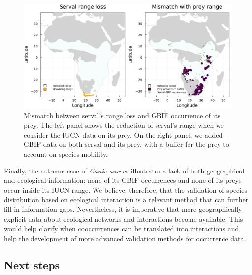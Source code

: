 \documentclass[11pt]{article}
\makeatletter
\def\maxwidth{\ifdim\Gin@nat@width>\linewidth\linewidth
\else\Gin@nat@width\fi}
\let\Oldincludegraphics\includegraphics
\renewcommand{\includegraphics}[1]{\Oldincludegraphics[width=\maxwidth]{#1}}
\makeatother
\begin{document}
\begin{figure}
\hypertarget{fig:serval}{%
\centering
\includegraphics{figures/serval_mismatch_combined.png}
\caption{Mismatch between serval's range loss and GBIF occurrence of its
prey. The left panel shows the reduction of serval's range when we
consider the IUCN data on its prey. On the right panel, we added GBIF
data on both serval and its prey, with a buffer for the prey to account
on species mobility.}\label{fig:serval}
}
\end{figure}

Finally, the extreme case of \emph{Canis aureus} illustrates a lack of
both geographical and ecological information: none of its GBIF
occurrences and none of its preys occur inside its IUCN range. We
believe, therefore, that the validation of species distribution based on
ecological interaction is a relevant method that can further fill in
information gaps. Nevertheless, it is imperative that more
geographically explicit data about ecological networks and interactions
become available. This would help clarify when cooccurrences can be
translated into interactions and help the development of more advanced
validation methods for occurrence data.

\hypertarget{next-steps}{%
\subsection{Next steps}\label{next-steps}}
\end{document}
